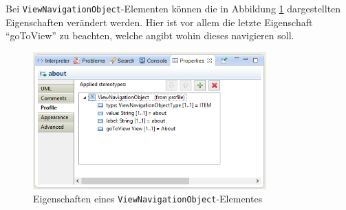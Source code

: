 Bei \texttt{ViewNavigationObject}-Elementen können die in Abbildung
\ref{Fig:ViewNavProp} dargestellten Eigenschaften verändert werden. Hier ist
vor allem die letzte Eigenschaft "`goToView"' zu beachten, welche angibt wohin
dieses navigieren soll.

\begin{figure}[htbp]
\begin{center}
\includegraphics[width=0.8\textwidth]{./img/Prop-ViewNavigationObjects.png}
\caption{Eigenschaften eines \texttt{ViewNavigationObject}-Elementes
}\label{Fig:ViewNavProp}
\end{center}
\end{figure}
